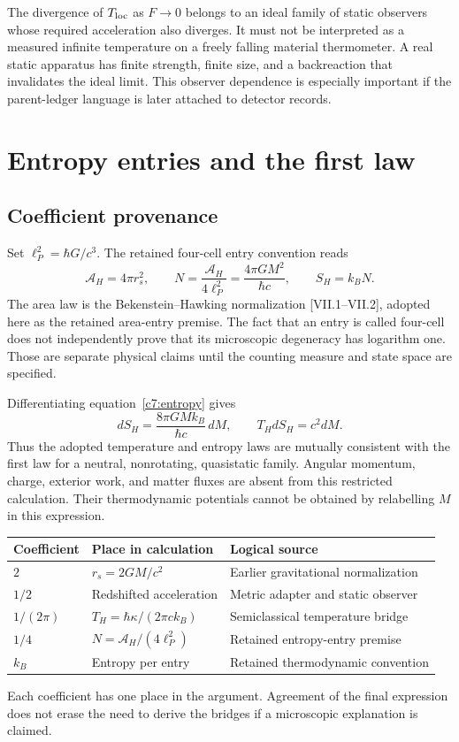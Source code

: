 The divergence of $T_{\rm loc}$ as $F\to0$ belongs to an ideal family of static observers whose required acceleration also diverges. It must not be interpreted as a measured infinite temperature on a freely falling material thermometer. A real static apparatus has finite strength, finite size, and a backreaction that invalidates the ideal limit. This observer dependence is especially important if the parent-ledger language is later attached to detector records.

\section{Entropy entries and the first law}
\subsection{Coefficient provenance}
Set $\ell_P^2=\hbar G/c^3$. The retained four-cell entry convention reads
\begin{equation}
 \mathcal A_H=4\pi r_s^2,\qquad
 N=\frac{\mathcal A_H}{4\ell_P^2}
   =\frac{4\pi GM^2}{\hbar c},\qquad
 S_H=k_BN.
 \label{c7:entropy}
\end{equation}
The area law is the Bekenstein--Hawking normalization [VII.1--VII.2], adopted here as the retained area-entry premise. The fact that an entry is called four-cell does not independently prove that its microscopic degeneracy has logarithm one. Those are separate physical claims until the counting measure and state space are specified.

Differentiating equation~\eqref{c7:entropy} gives
\begin{equation}
 dS_H=\frac{8\pi GMk_B}{\hbar c}\,dM,
 \qquad T_HdS_H=c^2dM.
 \label{c7:firstlaw}
\end{equation}
Thus the adopted temperature and entropy laws are mutually consistent with the first law for a neutral, nonrotating, quasistatic family. Angular momentum, charge, exterior work, and matter fluxes are absent from this restricted calculation. Their thermodynamic potentials cannot be obtained by relabelling $M$ in this expression.

\begin{center}
\small
\begin{tabularx}{\linewidth}{@{}lXX@{}}
\toprule
Coefficient & Place in calculation & Logical source\\
\midrule
$2$ & $r_s=2GM/c^2$ & Earlier gravitational normalization\\
$1/2$ & Redshifted acceleration & Metric adapter and static observer\\
$1/(2\pi)$ & $T_H=\hbar\kappa/(2\pi ck_B)$ & Semiclassical temperature bridge\\
$1/4$ & $N=\mathcal A_H/(4\ell_P^2)$ & Retained entropy-entry premise\\
$k_B$ & Entropy per entry & Retained thermodynamic convention\\
\bottomrule
\end{tabularx}
\end{center}
Each coefficient has one place in the argument. Agreement of the final expression does not erase the need to derive the bridges if a microscopic explanation is claimed.

